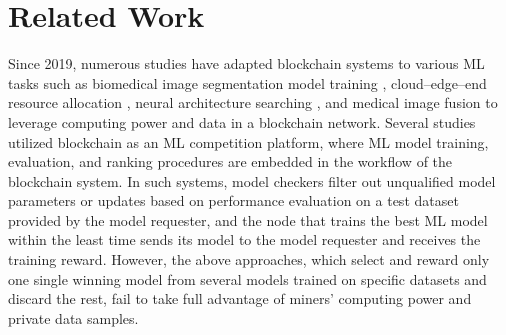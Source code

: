 \section{Related Work\label{sec:Related-Work}
\vspace{-0.1cm}}

Since 2019, numerous studies have adapted blockchain systems to various
ML tasks such as biomedical image segmentation model training \cite{li2020dlbc},
cloud–edge–end resource allocation \cite{Qiu2021}, neural architecture
searching \cite{LI2022100089}, and medical image fusion \cite{Xiang2023}
to leverage computing power and data in a blockchain network.  
Several studies \cite{BravoMarquez2019,Chenli2019,Kang2020,Li2021byzantine,Chai2021,Liu2021}
utilized blockchain as an ML competition platform, where ML model
training, evaluation, and ranking procedures are embedded in the workflow
of the blockchain system. In such systems, model checkers filter
out unqualified model parameters or updates based on performance evaluation
on a test dataset provided by the model requester, and the node that
trains the best ML model within the least time sends its model to
the model requester and receives the training reward. However, the
above approaches, which select and reward only one single winning
model from several models trained on specific datasets and discard
the rest, fail to take full advantage of miners' computing power and
private data samples.

